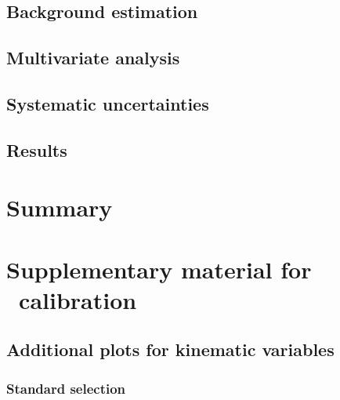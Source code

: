 \documentclass[letterpaper,12pt]{article}
\begin{document}
\subsection{Background estimation}
\subsection{Multivariate analysis}
\subsection{Systematic uncertainties}
\subsection{Results}




\section{Summary}







\printbibliography


\appendix
\newpage


\section{Supplementary material for \cjet\ calibration}
\subsection{Additional plots for kinematic variables}
\subsubsection{Standard selection}
\end{document}
